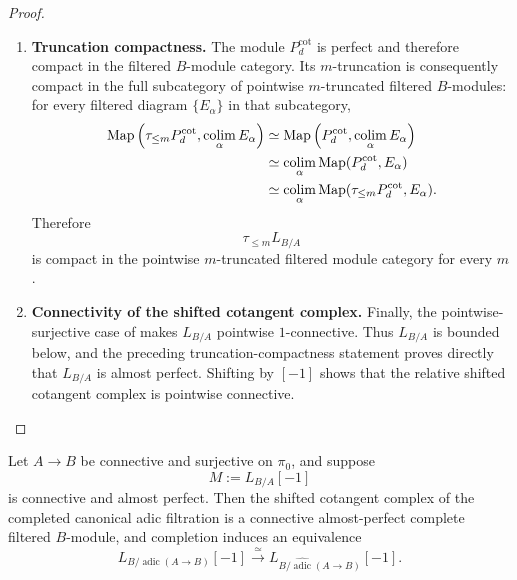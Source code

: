 \begin{proof}
\begin{enumerate}[label=\textup{(\arabic*)}]
    For \(d\geq1\), the morphism \(C_d\to B\) is pointwise an isomorphism on
    \(\pi_0\), and its relative cofibre \(Q_d\) is pointwise
    \((d+1)\)-connective. Hence
     makes
    \[
        L_{B/C_d}
    \]
    pointwise \((d+1)\)-connective. Consequently, for every fixed integer
    \(m\geq0\) and every \(d\geq\max\{m,1\}\), the preceding transitivity
    sequence induces an equivalence
    \[
        \tau_{\leq m}P_d^{\mathrm{cot}}
        \xrightarrow{\simeq}
        \tau_{\leq m}L_{B/A}.
    \]
    \item \textbf{Truncation compactness.}
    The module \(P_d^{\mathrm{cot}}\) is perfect and therefore compact in the
    filtered \(B\)-module category. Its \(m\)-truncation is consequently compact
    in the full subcategory of pointwise \(m\)-truncated filtered \(B\)-modules:
    for every filtered diagram \(\{E_\alpha\}\) in that subcategory,
    \[
    \begin{aligned}
        \operatorname{Map}
        \left(
            \tau_{\leq m}P_d^{\mathrm{cot}},
            \operatorname*{colim}_\alpha E_\alpha
        \right)
        &\simeq
        \operatorname{Map}
        \left(
            P_d^{\mathrm{cot}},
            \operatorname*{colim}_\alpha E_\alpha
        \right)
        \\
        &\simeq
        \operatorname*{colim}_\alpha
        \operatorname{Map}(P_d^{\mathrm{cot}},E_\alpha)
        \\
        &\simeq
        \operatorname*{colim}_\alpha
        \operatorname{Map}(\tau_{\leq m}P_d^{\mathrm{cot}},E_\alpha).
    \end{aligned}
    \]
    Therefore
    \[
        \tau_{\leq m}L_{B/A}
    \]
    is compact in the pointwise \(m\)-truncated filtered module category for every
    \(m\).
    \item \textbf{Connectivity of the shifted cotangent complex.}
    Finally, the pointwise-surjective case of
     makes
    \(L_{B/A}\) pointwise \(1\)-connective. Thus \(L_{B/A}\) is bounded below,
    and the preceding truncation-compactness statement proves directly that
    \(L_{B/A}\) is almost perfect. Shifting by \([-1]\) shows that the relative
    shifted cotangent complex is pointwise connective.
\end{enumerate}
\end{proof}


\begin{lemma}
\label{lem:cotangent-completion-adic}
Let \(A\to B\) be connective and surjective on \(\pi_0\), and suppose
\[
    M:=L_{B/A}[-1]
\]
is connective and almost perfect. Then the shifted cotangent complex of the completed
canonical adic filtration is a connective almost-perfect complete filtered
\(B\)-module, and completion induces an equivalence
\[
    L_{B/\operatorname{adic}(A\to B)}[-1]
    \xrightarrow{\simeq}
    L_{B/\widehat{\operatorname{adic}}(A\to B)}[-1].
\]
\end{lemma}


